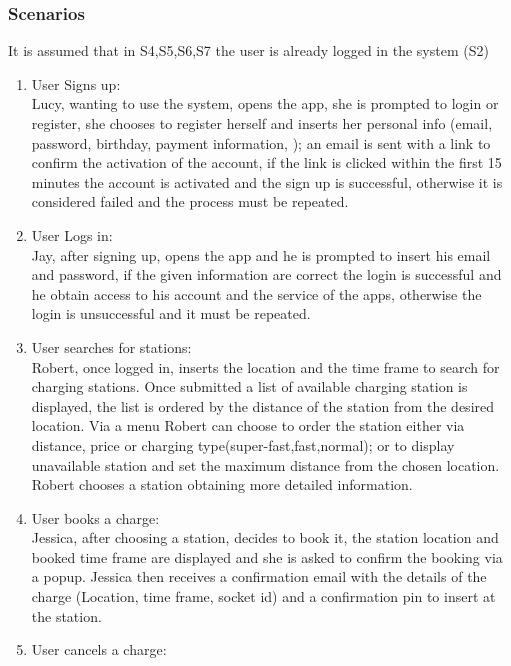 \subsubsection{Scenarios}
It is assumed that in S4,S5,S6,S7 the user is already logged in the system (S2)
\begin{enumerate}[label=S\arabic*]
      \item User Signs up:\\
            Lucy, wanting to use the system, opens the app, she is prompted to login or register,
            she chooses to register herself and inserts her personal info (email, password, birthday, payment information, );
            an email is sent with a link to confirm the activation of the account, if the link is clicked within
            the first 15 minutes the account is activated and the sign up is successful,
            otherwise it is considered failed and the process must be repeated.
      \item User Logs in:\\
            Jay, after signing up, opens the app and he is prompted to insert his email and password,
            if the given information are correct the login is successful and he obtain access to his account
            and the service of the apps, otherwise the login is unsuccessful and it must be repeated.
      \item User searches for stations:\\
            Robert, once logged in, inserts the location and the time frame to search for charging stations.
            Once submitted a list of available charging station is displayed, the list is ordered by the distance of the station
            from the desired location. Via a menu Robert can choose to order the station either via distance, price or charging type(super-fast,fast,normal);
            or to display unavailable station and set the maximum distance from the chosen location.
            Robert chooses a station obtaining more detailed information.
      \item User books a charge:\\
            Jessica, after choosing a station, decides to book it, the station location and booked time frame are displayed
            and she is asked to confirm the booking via a popup. Jessica then receives a confirmation email with the details
            of the charge (Location, time frame, socket id) and a confirmation pin to insert at the station.
      \item User cancels a charge:\\

\end{enumerate}
